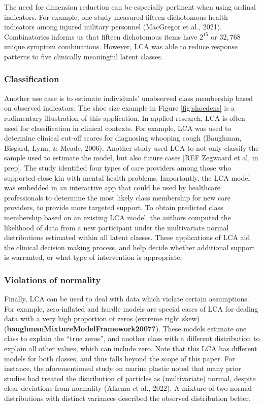 \documentclass[
  ,man,floatsintext]{apa6}
\begin{document}
The need for dimension reduction can be especially pertinent when using
ordinal indicators. For example, one study measured fifteen dichotomous
health indicators among injured military personnel
(MacGregor et al., 2021). Combinatorics informs us that fifteen
dichotomous items have \(2^{15}\) or \(32,768\) unique symptom combinations.
However, LCA was able to reduce response patterns to five clinically
meaningful latent classes.

\hypertarget{classification}{%
\subsubsection{Classification}\label{classification}}

Another use case is to estimate individuals' unobserved class membership
based on observed indicators. The shoe size example in Figure
\ref{fig:shoedens} is a rudimentary illustration of this application.
In applied research, LCA is often used for classification in clinical
contexts. For example, LCA was used to determine clinical cut-off scores
for diagnosing whooping cough (Baughman, Bisgard, Lynn, \& Meade, 2006). Another study
used LCA to not only classify the sample used to estimate the model, but
also future cases {[}REF Zegwaard et al, in prep{]}. The study identified
four types of care providers among those who supported close kin with
mental health problems. Importantly, the LCA model was embedded in an
interactive app that could be used by healthcare professionals to
determine the most likely class membership for new care providers, to
provide more targeted support. To obtain predicted class membership
based on an existing LCA model, the authors computed the likelihood of
data from a new participant under the multivariate normal distributions
estimated within all latent classes.
These applications of LCA aid the clinical decision making process, and
help decide whether additional support is warranted, or what type of
intervention is appropriate.

\hypertarget{violations-of-normality}{%
\subsubsection{Violations of normality}\label{violations-of-normality}}

Finally, LCA can be used to deal with data which violate certain
assumptions. For example, zero-inflated and hurdle models are special
cases of LCA for dealing data with a very high proportion of zeros
(extreme right skew) (\textbf{baughmanMixtureModelFramework2007?}). These models
estimate one class to explain the ``true zeros'', and another class with a
different distribution to explain all other values, which can include
zero. Note that this LCA has different models for both classes, and thus
falls beyond the scope of this paper.
For instance, the aforementioned study on marine plastic noted that many
prior studies had treated the distribution of particles as
(multivariate) normal, despite clear deviations from normality
(Alkema et al., 2022). A mixture of two normal distributions with
distinct variances described the observed distribution better.
\end{document}

